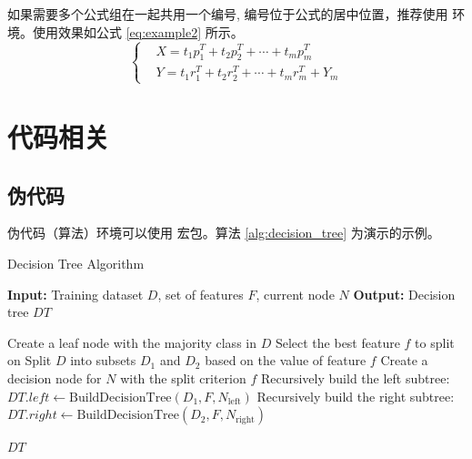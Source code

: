 \documentclass[
    report,     %
    oneside,    %
    UTF8,       %
    zihao=-4    %
]{config} %
\begin{document}
如果需要多个公式组在一起共用一个编号, 编号位于公式的居中位置，推荐使用  环境。使用效果如公式 \eqref{eq:example2} 所示。
\abovedisplayshortskip=4pt
\belowdisplayshortskip=4pt
\abovedisplayskip=4pt
\belowdisplayskip=4pt
\begin{equation}
\label{eq:example2}
\left\{
    \begin{aligned}
     & X = t_1p_1^T + t_2p_2^T + \cdots + t_mp_m^T \\
     & Y = t_1r_1^T + t_2r_2^T + \cdots + t_mr_m^T + Y_m
    \end{aligned}
\right.
\end{equation}





\chapter{代码相关}

\section{伪代码}

伪代码（算法）环境可以使用  宏包。算法 \ref{alg:decision_tree} 为演示的示例。

\begin{algorithm}
	\caption{Decision Tree Algorithm}
	\label{alg:decision_tree}
	\begin{algorithmic}[1]
		\STATE \textbf{Input:} Training dataset $D$, set of features $F$, current node $N$
		\STATE \textbf{Output:} Decision tree $DT$
		
			\STATE Create a leaf node with the majority class in $D$
		\ELSE
			\STATE Select the best feature $f$ to split on
			\STATE Split $D$ into subsets $D_1$ and $D_2$ based on the value of feature $f$
			\STATE Create a decision node for $N$ with the split criterion $f$
			\STATE Recursively build the left subtree: $DT.left \leftarrow \text{BuildDecisionTree}(D_1, F, N_{\text{left}})$
			\STATE Recursively build the right subtree: $DT.right \leftarrow \text{BuildDecisionTree}(D_2, F, N_{\text{right}})$
		\ENDIF
		
		\RETURN $DT$
	\end{algorithmic}  
\end{algorithm}
\vspace{-0.5em}  %
\end{document}
